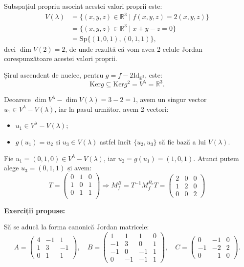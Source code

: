 \documentclass[11pt,a4paper]{article}
\newcommand\seq{\subseteq}
\newcommand\RR{\mathbb{R}}
\newcommand\Ker{\mathrm{Ker}}
\theoremstyle{dotless}
\theoremstyle{dotlessdr}
\begin{document}
Subspațiul propriu asociat acestei valori proprii este:
\begin{align*}
  V(\lambda) &= \{ (x, y, z) \in \RR^3 \mid f(x, y, z) = 2(x, y, z) \} \\
             &= \{ (x, y, z) \in \RR^3 \mid x + y - z = 0 \} \\
             &= \mathrm{Sp}\{(1, 0, 1), (0, 1, 1) \},
\end{align*}
deci $\dim V(2) = 2$, de unde rezultă că vom avea 2 celule Jordan corespunzătoare
acestei valori proprii.

Șirul ascendent de nuclee, pentru $g = f - 2\mathrm{Id}_{\RR^3}$, este:
\[
  \mathrm{Ker} g \seq \Ker g^2 = V^\lambda = \RR^3.
\]

Deoarece $\dim V^\lambda - \dim V(\lambda) = 3 - 2 = 1$, avem un singur vector
$u_1 \in V^\lambda - V(\lambda)$, iar la pasul următor, avem 2 vectori:
\begin{itemize}
\item $u_1 \in V^\lambda - V(\lambda)$;
\item $g(u_1) = u_2$ și $u_3 \in V(\lambda)$ astfel încît $\{u_2, u_3\}$ să fie bază a
  lui $V(\lambda)$.
\end{itemize}

Fie $u_1 = (0, 1, 0) \in V^{\lambda} - V(\lambda)$, iar $u_2 = g(u_1) = (1, 0, 1)$.
Atunci putem alege $u_3  = (0, 1, 1)$ și avem:
\[
  T =
  \begin{pmatrix}
    0 & 1 & 0 \\
    1 & 0 & 1 \\
    0 & 1 & 1 \\
  \end{pmatrix} \Rightarrow M_f^B = T^{-1}M_f^{B_c} T =
  \begin{pmatrix}
    2 & 0 & 0 \\
    1 & 2 & 0 \\
    0 & 0 & 2
  \end{pmatrix}
\]

\textbf{Exerciții propuse:}

Să se aducă la forma canonică Jordan matricele:
\[
  A = \begin{pmatrix}
    4 & -1 & 1 \\
    1 & 3 & -1 \\
    0 & 1 & 1
  \end{pmatrix}, \quad
  B =
  \begin{pmatrix}
    1 & 1 & 1 & 0 \\
    -1 & 3 & 0 & 1 \\
    -1 & 0 & -1 & 1 \\
    0 & -1 & -1 & 1
  \end{pmatrix}, \quad
  C =
  \begin{pmatrix}
    0 & -1 & 0 \\
    -1 & -2 & 2 \\
    0 & -1 & 0
  \end{pmatrix}.
\]
\end{document}
